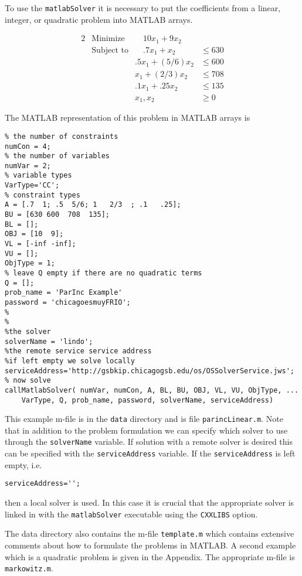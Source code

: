 \documentclass[11pt]{article}
\renewcommand{\_}{{\char"5F}}
\renewcommand{\{}{{\char"7B}}
\renewcommand{\}}{{\char"7D}}
\renewcommand{\^}{{\char"0D}}
\renewcommand{\'}{{\char"0D}}
\begin{document}
To use the {\tt matlabSolver} it is necessary to put the coefficients  from a linear, integer, or quadratic problem into MATLAB arrays. 

\begin{alignat}{2}
& \mbox{Minimize} & \quad 
10 x_{1} + 9 x_{2}\label{eq:parinobj}\\
& \mbox{Subject to} & \quad .7x_{1} + x_{2}  &\le 630  \label{eq:parinccon1}\\
& & .5x_{1} + (5/6) x_{2} &\le 600 \label{eq:parinccon2}\\
& &  x_{1} + (2/3) x_{2} &\le 708 \label{eq:parinccon3}\\
& & .1x_{1} + .25 x_{2} &\le 135 \label{eq:parinccon4}\\
& & x_{1}, x_{2} &\ge 0 \label{eq:parincnonneg}
\end{alignat}

The MATLAB representation of this problem in MATLAB arrays is
\begin{verbatim}
% the number of constraints
numCon = 4;
% the number of variables
numVar = 2;
% variable types 
VarType='CC';
% constraint types
A = [.7  1; .5  5/6; 1   2/3  ; .1   .25];
BU = [630 600  708  135];
BL = [];
OBJ = [10  9];
VL = [-inf -inf];
VU = [];
ObjType = 1;
% leave Q empty if there are no quadratic terms
Q = [];
prob_name = 'ParInc Example'
password = 'chicagoesmuyFRIO';
%
%
%the solver
solverName = 'lindo';
%the remote service service address
%if left empty we solve locally
serviceAddress='http://gsbkip.chicagogsb.edu/os/OSSolverService.jws';
% now solve
callMatlabSolver( numVar, numCon, A, BL, BU, OBJ, VL, VU, ObjType, ... 
    VarType, Q, prob_name, password, solverName, serviceAddress)
\end{verbatim}
This example m-file is in the {\tt data} directory and is file {\tt parincLinear.m}. Note that in addition to the problem formulation we can specify which solver to use through the {\tt solverName} variable.  If solution with a remote solver is desired this can be specified with the {\tt serviceAddress} variable.  If the {\tt serviceAddress} is left empty, i.e.
\begin{verbatim}
serviceAddress='';
\end{verbatim}
then a local solver is used. In this case  it is crucial that the appropriate solver is linked in with the {\tt matlabSolver} executable using the {\tt CXXLIBS} option. 


The data directory  also contains the m-file  {\tt template.m} which contains extensive comments about how to formulate the problems in MATLAB.  A second example which is a quadratic problem is given in the Appendix. The appropriate m-file is {\tt markowitz.m}.
\end{document}
